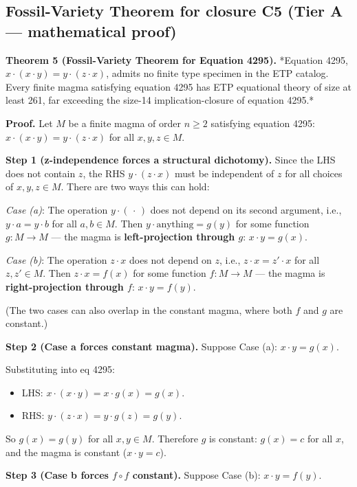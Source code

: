 \documentclass[11pt,reqno]{amsart}
\theoremstyle{plain}
\theoremstyle{definition}
\begin{document}
\subsection{Fossil-Variety Theorem for closure C5 (Tier A --- mathematical proof)}

\textbf{Theorem 5 (Fossil-Variety Theorem for Equation 4295).} *Equation 4295, $x \cdot (x \cdot y) = y \cdot (z \cdot x)$, admits no finite type specimen in the ETP catalog. Every finite magma satisfying equation 4295 has ETP equational theory of size at least 261, far exceeding the size-14 implication-closure of equation 4295.*

\textbf{Proof.} Let $M$ be a finite magma of order $n \geq 2$ satisfying equation 4295: $x \cdot (x \cdot y) = y \cdot (z \cdot x)$ for all $x, y, z \in M$.

\textbf{Step 1 (z-independence forces a structural dichotomy).} Since the LHS does not contain $z$, the RHS $y \cdot (z \cdot x)$ must be independent of $z$ for all choices of $x, y, z \in M$. There are two ways this can hold:

\textit{Case (a)}: The operation $y \cdot (\,\cdot\,)$ does not depend on its second argument, i.e., $y \cdot a = y \cdot b$ for all $a, b \in M$. Then $y \cdot \text{anything} = g(y)$ for some function $g : M \to M$ --- the magma is \textbf{left-projection through $g$}: $x \cdot y = g(x)$.

\textit{Case (b)}: The operation $z \cdot x$ does not depend on $z$, i.e., $z \cdot x = z' \cdot x$ for all $z, z' \in M$. Then $z \cdot x = f(x)$ for some function $f : M \to M$ --- the magma is \textbf{right-projection through $f$}: $x \cdot y = f(y)$.

(The two cases can also overlap in the constant magma, where both $f$ and $g$ are constant.)

\textbf{Step 2 (Case a forces constant magma).} Suppose Case (a): $x \cdot y = g(x)$.

Substituting into eq 4295:
\begin{itemize}
\item LHS: $x \cdot (x \cdot y) = x \cdot g(x) = g(x)$.
\item RHS: $y \cdot (z \cdot x) = y \cdot g(z) = g(y)$.
\end{itemize}

So $g(x) = g(y)$ for all $x, y \in M$. Therefore $g$ is constant: $g(x) = c$ for all $x$, and the magma is constant ($x \cdot y = c$).

\textbf{Step 3 (Case b forces $f \circ f$ constant).} Suppose Case (b): $x \cdot y = f(y)$.
\end{document}
